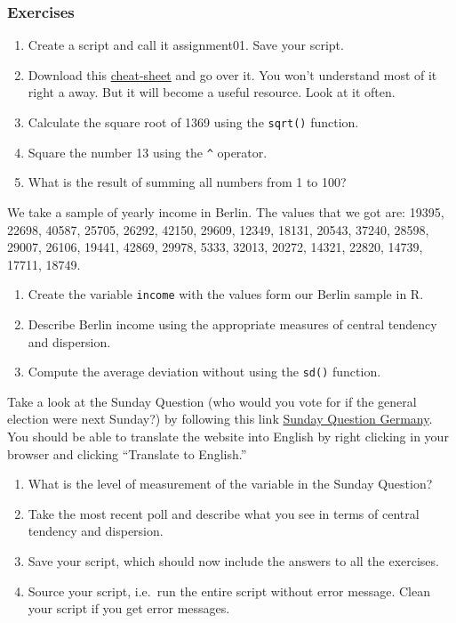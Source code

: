 \documentclass[]{article}
\providecommand{\tightlist}{%
  \setlength{\itemsep}{0pt}\setlength{\parskip}{0pt}}
\theoremstyle{definition}
\theoremstyle{definition}
\theoremstyle{definition}
\theoremstyle{remark}
\begin{document}
\subsubsection{Exercises}\label{exercises}

\begin{enumerate}
\def\labelenumi{\arabic{enumi}.}
\tightlist
\item
  Create a script and call it assignment01. Save your script.
\item
  Download this
  \href{https://www.rstudio.com/wp-content/uploads/2016/06/r-cheat-sheet.pdf}{cheat-sheet}
  and go over it. You won't understand most of it right a away. But it
  will become a useful resource. Look at it often.
\item
  Calculate the square root of 1369 using the \texttt{sqrt()} function.
\item
  Square the number 13 using the \texttt{\^{}} operator.
\item
  What is the result of summing all numbers from 1 to 100?
\end{enumerate}

We take a sample of yearly income in Berlin. The values that we got are:
19395, 22698, 40587, 25705, 26292, 42150, 29609, 12349, 18131, 20543,
37240, 28598, 29007, 26106, 19441, 42869, 29978, 5333, 32013, 20272,
14321, 22820, 14739, 17711, 18749.

\begin{enumerate}
\def\labelenumi{\arabic{enumi}.}
\setcounter{enumi}{5}
\tightlist
\item
  Create the variable \texttt{income} with the values form our Berlin
  sample in R.
\item
  Describe Berlin income using the appropriate measures of central
  tendency and dispersion.
\item
  Compute the average deviation without using the \texttt{sd()}
  function.
\end{enumerate}

Take a look at the Sunday Question (who would you vote for if the
general election were next Sunday?) by following this link
\href{https://www.wahlrecht.de/umfragen/}{Sunday Question Germany}. You
should be able to translate the website into English by right clicking
in your browser and clicking ``Translate to English.''

\begin{enumerate}
\def\labelenumi{\arabic{enumi}.}
\setcounter{enumi}{8}
\tightlist
\item
  What is the level of measurement of the variable in the Sunday
  Question?
\item
  Take the most recent poll and describe what you see in terms of
  central tendency and dispersion.
\item
  Save your script, which should now include the answers to all the
  exercises.
\item
  Source your script, i.e.~run the entire script without error message.
  Clean your script if you get error messages.
\end{enumerate}
\end{document}
